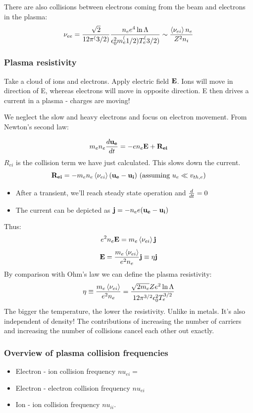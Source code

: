 There are also collisions between electrons coming from the beam and electrons in the plasma:
\[ \nu_{ee} = \frac{\sqrt{2}}{12 \pi^(3/2)} \frac{n_e e^4 \ln{\Lambda}}{\epsilon_0^2 m_e^(1/2) T_e^(3/2)} \sim \frac{\left< \nu_{ei} \right> n_e}{Z^2 n_i} \]

\subsubsection{Plasma resistivity}
Take a cloud of ions and electrons. Apply electric field $\mathbf{E}$. Ions will move in direction of E, whereas electrons will move in opposite direction. E then drives a current in a plasma - charges are moving!

We neglect the slow and heavy electrons and focus on electron movement. From Newton's second law:

\[m_e n_e \frac{d \mathbf{u_e}}{d t} = -e n_e \mathbf{E} + \mathbf{R_{ei}} \]
$R_{ei}$ is the collision term we have just calculated. This slows down the current.
\[\mathbf{R_{ei}} = - m_e n_e \left< \nu_{ei} \right> (\mathbf{u_e}-\mathbf{u_i}) \text{ (assuming } u_e \ll v_{th,e} ) \]

\begin{itemize}
\item After a transient, we'll reach steady state operation and $\frac{d }{d t}=0$
\item The current can be depicted as $\mathbf{j} = - n_e e (\mathbf{u_e}-\mathbf{u_i})$
\end{itemize}
Thus:
\[ e^2 n_e \mathbf{E} = m_e \left< \nu_{ei} \right> \mathbf{j}\]
\[ \mathbf{E} = \frac{m_e \left< \nu_{ei} \right>}{e^2 n_e} \mathbf{j} \equiv \eta \mathbf{j} \]
By comparison with Ohm's law we can define the plasma resistivity:
\[ \eta \equiv \frac{m_e \left< \nu_{ei} \right>}{e^2 n_e} = \frac{ \sqrt{2 m_e} Z	e^2 \ln{\Lambda}}{12 \pi^{3/2} \epsilon_0^2 T_e^{3/2}} \]
The bigger the temperature, the lower the resistivity. Unlike in metals. It's also independent of density! The contributions of increasing the number of carriers and increasing the number of collisions cancel each other out exactly.
\subsubsection{Overview of plasma collision frequencies}
\begin{itemize}
\item Electron - ion collision frequency $nu_{ei} = $ 
\item Electron - electron collision frequency $nu_{ei}$
\item Ion - ion collision frequency $nu_{ii}$.
\end{itemize}

